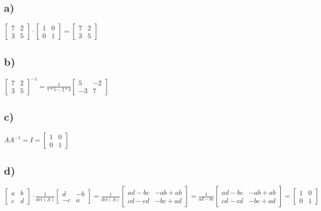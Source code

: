 \subsection*{a) }
	$ 
    			\begin{bmatrix}
    			7  & 2 \\
    			3  & 5
    			\end{bmatrix}
    			\cdot
    			\begin{bmatrix}
    			1 & 0  \\
    			0 & 1
    			\end{bmatrix}
    			=
    			\begin{bmatrix}
    			7  & 2 \\
    			3  & 5
    			\end{bmatrix}
    			$
    			
\subsection*{b) }
				$
				\begin{bmatrix}
    			7  & 2 \\
    			3  & 5
    			\end{bmatrix}
				^{-1}
				=
				\frac{1}{7*5-2*3}
				\begin{bmatrix}
    			5  & -2 \\
    			-3  & 7
    			\end{bmatrix}
				$
\subsection*{c) }
$				A A^{-1} = I =
				\begin{bmatrix}
    			1  & 0 \\
    			0  & 1
    			\end{bmatrix}
    			$ 
\subsection*{d) }
				$
				\begin{bmatrix}
    			a  & b \\
    			c  & d
    			\end{bmatrix}  
    			\cdot
    			\frac{1}{det(A)}
    			\begin{bmatrix}
    			d  & -b \\
    			-c & a
    			\end{bmatrix}
    			=
    			\frac{1}{det(A)}
    			\begin{bmatrix}
    			ad - bc  & -ab + ab \\
    			cd - cd  & -bc + ad
    			\end{bmatrix} 
    			=
    			\frac{1}{ad-bc}
    			\begin{bmatrix}
    			ad - bc  & -ab + ab \\
    			cd - cd  & -bc + ad
    			\end{bmatrix} 
    			=
    			\begin{bmatrix}
    			1 & 0 \\
    			0 & 1
    			\end{bmatrix} 
    			$